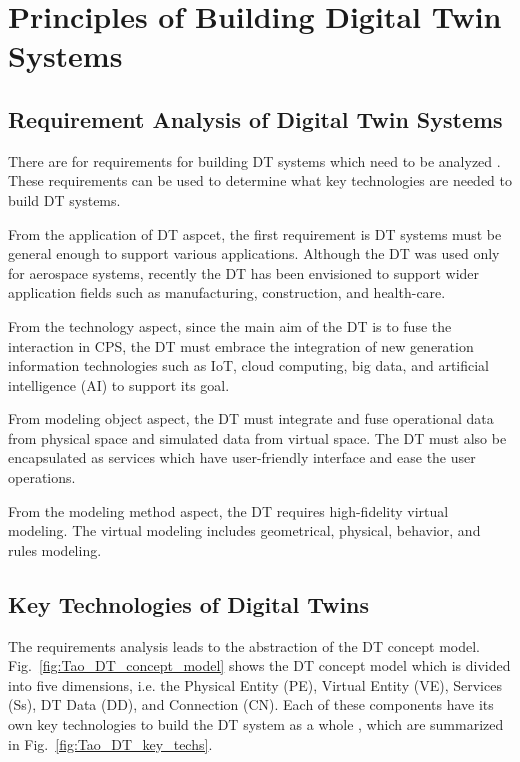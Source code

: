 \documentclass[article]{aaltoseries}
\begin{document}

\section{Principles of Building Digital Twin Systems}
\subsection{Requirement Analysis of Digital Twin Systems}
There are for requirements for building DT systems which need to be analyzed \cite{Tao2019}. These requirements can be used to determine what key technologies are needed to build DT systems.

From the application of DT aspcet, the first requirement is DT systems must be general enough to support various applications. Although the DT was used only for aerospace systems, recently the DT has been envisioned to support wider application fields such as manufacturing, construction, and health-care.

From the technology aspect, since the main aim of the DT is to fuse the interaction in CPS, the DT must embrace the integration of new generation information technologies such as IoT, cloud computing, big data, and artificial intelligence (AI) to support its goal.

From modeling object aspect, the DT must integrate and fuse operational data from physical space and simulated data from virtual space. The DT must also be encapsulated as services which have user-friendly interface and ease the user operations.

From the modeling method aspect, the DT requires high-fidelity virtual modeling. The virtual modeling includes geometrical, physical, behavior, and rules modeling.

\subsection{Key Technologies of Digital Twins}
The requirements analysis leads to the abstraction of the DT concept model. Fig.~\ref{fig:Tao_DT_concept_model} shows the DT concept model which is divided into five dimensions, i.e. the Physical Entity (PE), Virtual Entity (VE), Services (Ss), DT Data (DD), and Connection (CN). Each of these components have its own key technologies to build the DT system as a whole \cite{Tao2019}, which are summarized in Fig.~\ref{fig:Tao_DT_key_techs}.
\end{document}
